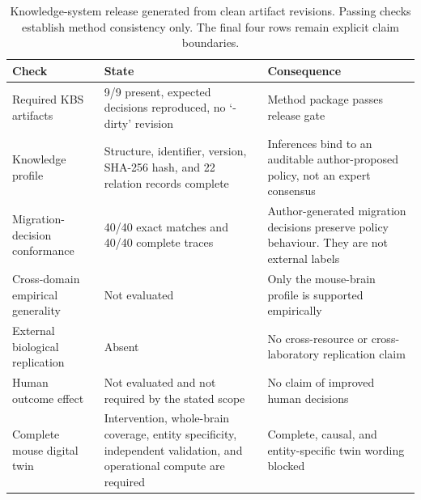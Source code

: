 \begin{table}[t!]
\centering
\caption{Knowledge-system release generated from clean artifact revisions. Passing checks establish method consistency only. The final four rows remain explicit claim boundaries.}
\label{tab:release-summary}
\footnotesize
\renewcommand{\arraystretch}{1.11}
\begin{tabularx}{\textwidth}{@{}p{}p{}Y@{}}
\toprule
Check & State & Consequence \\
\midrule
Required KBS artifacts & 9/9 present, expected decisions reproduced, no `-dirty' revision & Method package passes release gate \\
Knowledge profile & Structure, identifier, version, SHA-256 hash, and 22 relation records complete & Inferences bind to an auditable author-proposed policy, not an expert consensus \\
Migration-decision conformance & 40/40 exact matches and 40/40 complete traces & Author-generated migration decisions preserve policy behaviour. They are not external labels \\
Cross-domain empirical generality & Not evaluated & Only the mouse-brain profile is supported empirically \\
External biological replication & Absent & No cross-resource or cross-laboratory replication claim \\
Human outcome effect & Not evaluated and not required by the stated scope & No claim of improved human decisions \\
Complete mouse digital twin & Intervention, whole-brain coverage, entity specificity, independent validation, and operational compute are required & Complete, causal, and entity-specific twin wording blocked \\
\bottomrule
\end{tabularx}
\end{table}
